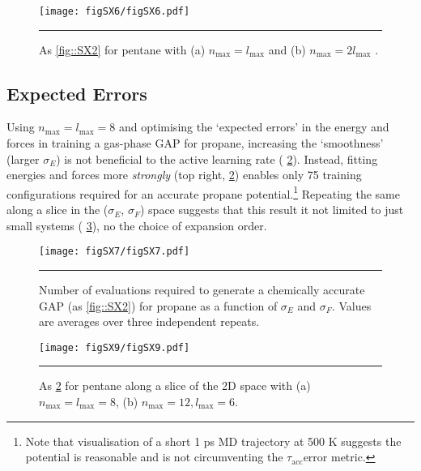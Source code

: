 \documentclass[11pt]{article}
\numberwithin{equation}{subsection}
\newcommand{\tacc}{$\tau_\text{acc}$}
\newcommand{\comment}[1]{}
\begin{document}
\begin{figure}[h!]
	\centering
	\vspace{0.4cm}
	\texttt{[image: figSX6/figSX6.pdf]}
	\vspace{0.2cm}
	\hrule
	\vspace{0.1cm}
	\caption{As \figurename{ \ref{fig::SX2}} for pentane with (a) $n_\text{max} = l_\text{max}$ and (b) $n_\text{max} = 2l_\text{max}$ .}
	\label{fig::SX6}
\end{figure}


\clearpage
\subsection{Expected Errors}

\comment{
	TJW: What do you mean by expected errors?
}

Using $n_\text{max} = l_\text{max} = 8$ and optimising the `expected errors' in the energy and forces in training a gas-phase GAP for propane, increasing the `smoothness' (larger $\sigma_E$) is not beneficial to the active learning rate (\figurename{ \ref{fig::SX7}}). Instead, fitting energies and forces more \emph{strongly} (top right, \figurename{ \ref{fig::SX7}}) enables only 75 training configurations required for an accurate propane potential.\footnote{Note that visualisation of a short 1 ps MD trajectory at 500 K suggests the potential is reasonable and is not circumventing the \tacc error metric.} Repeating the same along a slice in the ($\sigma_E$,  $\sigma_F$) space suggests that this result it not limited to just small systems (\figurename{ \ref{fig::SX9}}), no the choice of expansion order.


\begin{figure}[h!]
	\centering
	\vspace{0.4cm}
	\texttt{[image: figSX7/figSX7.pdf]}
	\vspace{0.2cm}
	\hrule
	\vspace{0.1cm}
	\caption{Number of evaluations required to generate a chemically accurate GAP (as \figurename{ \ref{fig::SX2}}) for propane as a function of $\sigma_E$ and $\sigma_F$. Values are averages over three independent repeats.}
	\label{fig::SX7}
\end{figure}


\begin{figure}[h!]
	\centering
	\texttt{[image: figSX9/figSX9.pdf]}
	\vspace{0.1cm}
	\hrule
	\vspace{0.1cm}
	\caption{As \figurename{ \ref{fig::SX7}} for pentane along a slice of the 2D space with (a) $n_\text{max} = l_\text{max} = 8$, (b) $n_\text{max} = 12, l_\text{max} = 6$.}
	\label{fig::SX9}
\end{figure}
\end{document}
